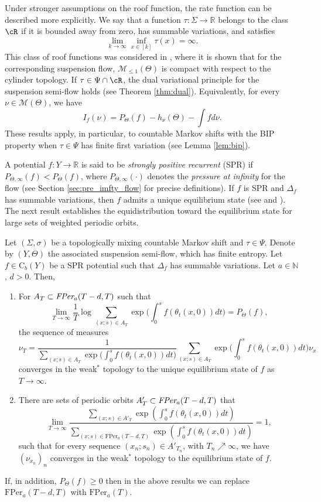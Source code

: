 \documentclass[letterpaper,11pt]{amsart}
\numberwithin{equation}{section}     %
\newcommand{\M}{\mathcal{M}}
\newcommand{\N}{\mathbb{N}}
\def\N{{\mathbb N}}
\def\M{{\mathcal M}}
\def\le{\leqslant}
\def\ge{\geqslant}
\def\M{\mathcal{M}}
\begin{document}
Under stronger assumptions on the roof function, the rate function can be described more explicitly. We say that a function 
$\tau:\Sigma \to \mathbb{R}$ belongs to the class $\cR$ if it is bounded away from zero, has summable variations, and satisfies 
\[\lim_{k\to\infty}\inf_{x\in[k]}\tau(x)=\infty.\]
  This class of roof functions was considered in \cite{iv}, where it is shown that for the corresponding suspension flow,  $\M_{\le 1}(\Theta)$ is compact with respect to the cylinder topology.  If $\tau \in \Psi\cap \cR$,  the dual variational principle for the suspension semi-flow holds (see Theorem \ref{thm:dual}). Equivalently, for every $\nu\in\M(\Theta)$, we have
  \[ I_f(\nu)=P_\Theta(f)- h_\nu(\Theta)-\int f d\nu.\]
These results apply, in particular, to countable Markov shifts with the BIP property when $\tau\in \Psi$ has finite first variation (see Lemma \ref{lem:bip}).

A potential  $f:Y \to \mathbb{R}$ is said to be \emph{strongly positive recurrent} (SPR) if $P_{\Theta,\infty}(f)<P_{\Theta}(f)$, where $P_{\Theta,\infty}( \cdot)$ denotes the \emph{pressure at infinity} for the flow (see Section \ref{sec:pre_imfty_flow} for precise definitions). If $f$ is SPR and $\Delta_f$ has summable variations, then $f$ admits a unique equilibrium state (see \cite[Theorem 8.1]{v} and \cite[Theorem 3.5]{ijt}). The next result establishes the equidistribution toward the equilibrium state for large sets of weighted periodic orbits.

\begin{theorem} \label{thm_equi2}
 Let $(\Sigma,\sigma)$ be a topologically mixing countable Markov shift  and  $\tau\in\Psi$. Denote by  $(Y,\Theta)$ the associated suspension semi-flow, which has finite entropy. Let  $f\in \mathrm{C}_b(Y)$ be a SPR potential such that $\Delta_f$ has summable variations. Let $a\in \N$, $d>0$. Then,
 \begin{enumerate}
\item[(a)] For $A_T\subset \emph{FPer}_a(T-d,T)$ such that
$$\lim_{T\to\infty}\frac{1}{T}\log\sum_{(x;s)\in A_T}\exp\bigg(\int_0^{s}f(\theta_t(x,0))dt\bigg)=P_\Theta(f),$$
the sequence of measures $$\nu_T=\frac{1}{\sum_{(x;s)\in A_T}\exp\big(\int_0^{s}f(\theta_t(x,0))dt\big)}\sum_{(x;s)\in A_T}\exp\bigg(\int_0^{s}f(\theta_t(x,0))dt\bigg)\nu_x$$
converges in the weak$^\ast$ topology to the unique equilibrium state of $f$ as $T\to\infty$. 
\item[(b)] There are sets of periodic orbits $A'_T\subset \emph{FPer}_a(T-d,T)$ that
$$\lim_{T\to\infty}\frac{\sum_{(x;s)\in A'_T}\exp(\int_0^sf(\theta_t(x,0))dt)}{\sum_{(x;s)\in \mathrm{FPer}_a(T-d,T)}\exp(\int_0^sf(\theta_t(x,0))dt)}=1,$$
such that for every sequence $(x_n;s_n)\in A'_{T_n}$, with $T_n\nearrow\infty$, we have $(\nu_{x_n})_n$ converges in the weak$^\ast$ topology to the equilibrium state of $f$.
\end{enumerate}
If, in addition, $P_{\Theta}(f)\ge0$ then in the above results we can replace $\mathrm{FPer}_a(T-d,T)$ with $\mathrm{FPer}_a(T)$.
\end{theorem}
\end{document}
